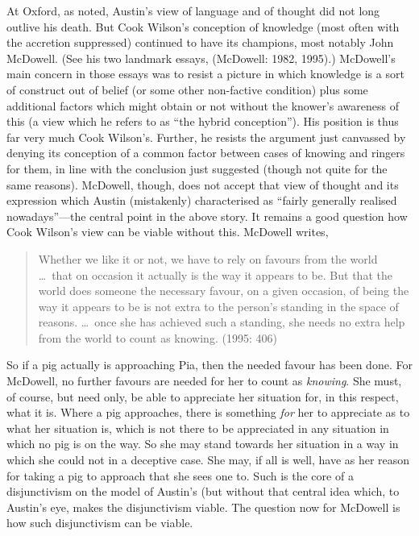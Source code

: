 At Oxford, as noted, Austin's view of language and of thought did not long outlive his death. But Cook Wilson's conception of knowledge (most often with the accretion suppressed) continued to have its champions, most notably John McDowell. (See his two landmark essays, (McDowell: 1982, 1995).) McDowell’s main concern in those essays was to resist a picture in which knowledge is a sort of construct out of belief (or some other non-factive condition) plus some additional factors which might obtain or not without the knower’s awareness of this (a view which he refers to as ``the hybrid conception''). His position is thus far very much Cook Wilson's. Further, he resists the argument just canvassed by denying its conception of a common factor between cases of knowing and ringers for them, in line with the conclusion just suggested (though not quite for the same reasons). McDowell, though, does not accept that view of thought and its expression which Austin (mistakenly) characterised as ``fairly generally realised nowadays''---the central point in the above story. It remains a good question how Cook Wilson’s view can be viable without this. McDowell writes,
\begin{quote}
	Whether we like it or not, we have to rely on favours from the world \ldots\ that on occasion it actually is the way it appears to be. But that the world does someone the necessary favour, on a given occasion, of being the way it appears to be is not extra to the person’s standing in the space of reasons. \ldots\ once she has achieved such a standing, she needs no extra help from the world to count as knowing. (1995: 406)
\end{quote}
So if a pig actually is approaching Pia, then the needed favour has been done. For McDowell, no further favours are needed for her to count as \emph{knowing}. She must, of course, but need only, be able to appreciate her situation for, in this respect, what it is. Where a pig approaches, there is something \emph{for} her to appreciate as to what her situation is, which is not there to be appreciated in any situation in which no pig is on the way. So she may stand towards her situation in a way in which she could not in a deceptive case. She may, if all is well, have as her reason for taking a pig to approach that she sees one to. Such is the core of a disjunctivism on the model of Austin's (but without that central idea which, to Austin’s eye, makes the disjunctivism viable. The question now for McDowell is how such disjunctivism can be viable.

